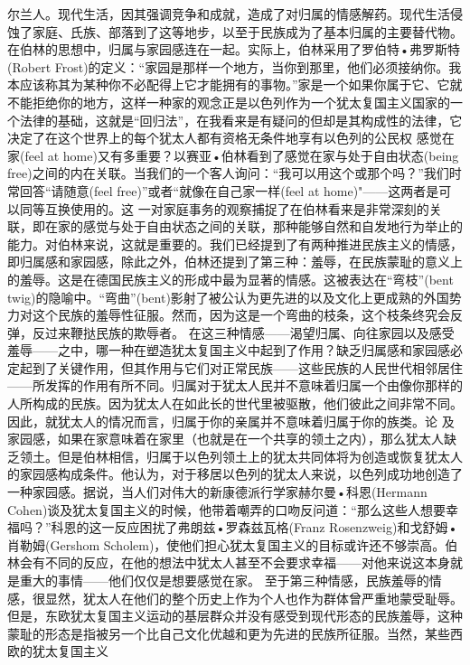\documentclass{article}
\begin{document}
\newpage
尔兰人。现代生活，因其强调竞争和成就，造成了对归属的情感解药。现代生活侵蚀了家庭、氏族、部落到了这等地步，以至于民族成为了基本归属的主要替代物。
     在伯林的思想中，归属与家园感连在一起。实际上，伯林采用了罗伯特•弗罗斯特(Robert Frost)的定义：“家园是那样一个地方，当你到那里，他们必须接纳你。我本应该称其为某种你不必配得上它才能拥有的事物。”家是一个如果你属于它、它就不能拒绝你的地方，这样一种家的观念正是以色列作为一个犹太复国主义国家的一个法律的基础，这就是“回归法”，在我看来是有疑问的但却是其构成性的法律，它决定了在这个世界上的每个犹太人都有资格无条件地享有以色列的公民权
     感觉在家(feel at home)又有多重要？以赛亚•伯林看到了感觉在家与处于自由状态(being free)之间的内在关联。当我们的一个客人询问：“我可以用这个或那个吗？”我们时常回答“请随意(feel free)”或者“就像在自己家一样(feel at home)"——这两者是可以同等互换使用的。这
\newpage
一对家庭事务的观察捕捉了在伯林看来是非常深刻的关联，即在家的感觉与处于自由状态之间的关联，那种能够自然和自发地行为举止的能力。对伯林来说，这就是重要的。我们已经提到了有两种推进民族主义的情感，即归属感和家园感，除此之外，伯林还提到了第三种：羞辱，在民族蒙耻的意义上的羞辱。这是在德国民族主义的形成中最为显著的情感。这被表达在“弯枝”(bent twig)的隐喻中。“弯曲”(bent)影射了被公认为更先进的以及文化上更成熟的外国势力对这个民族的羞辱性征服。然而，因为这是一个弯曲的枝条，这个枝条终究会反弹，反过来鞭挞民族的欺辱者。
     在这三种情感——渴望归属、向往家园以及感受羞辱——之中，哪一种在塑造犹太复国主义中起到了作用？缺乏归属感和家园感必定起到了关键作用，但其作用与它们对正常民族——这些民族的人民世代相邻居住——所发挥的作用有所不同。归属对于犹太人民并不意味着归属一个由像你那样的人所构成的民族。因为犹太人在如此长的世代里被驱散，他们彼此之间非常不同。因此，就犹太人的情况而言，归属于你的亲属并不意味着归属于你的族类。论
\newpage
及家园感，如果在家意味着在家里（也就是在一个共享的领土之内），那么犹太人缺乏领土。但是伯林相信，归属于以色列领土上的犹太共同体将为创造或恢复犹太人的家园感构成条件。他认为，对于移居以色列的犹太人来说，以色列成功地创造了一种家园感。据说，当人们对伟大的新康德派行学家赫尔曼•科恩(Hermann Cohen)谈及犹太复国主义的时候，他带着嘲弄的口吻反问道：“那么这些人想要幸福吗？”科恩的这一反应困扰了弗朗兹•罗森兹瓦格(Franz Rosenzweig)和戈舒姆•肖勒姆(Gershom Scholem)，使他们担心犹太复国主义的目标或许还不够崇高。伯林会有不同的反应，在他的想法中犹太人甚至不会要求幸福——对他来说这本身就是重大的事情——他们仅仅是想要感觉在家。
     至于第三种情感，民族羞辱的情感，很显然，犹太人在他们的整个历史上作为个人也作为群体曾严重地蒙受耻辱。但是，东欧犹太复国主义运动的基层群众并没有感受到现代形态的民族羞辱，这种蒙耻的形态是指被另一个比自己文化优越和更为先进的民族所征服。当然，某些西欧的犹太复国主义
\end{document}
